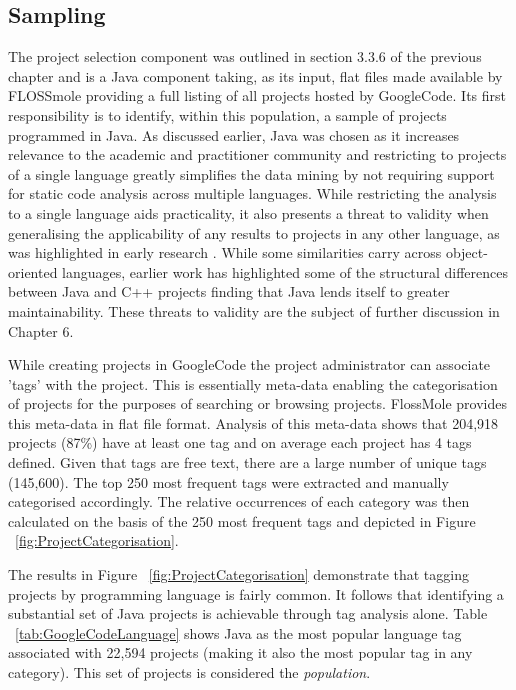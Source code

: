\subsection{Sampling}
The project selection component was outlined in section 3.3.6 of the previous chapter and is a Java component taking, as its input, flat files made available by FLOSSmole providing a full listing of all projects hosted by GoogleCode. Its first responsibility is to identify, within this population, a sample of projects programmed in Java. As discussed earlier, Java was chosen as it increases relevance to the academic and practitioner community and restricting to projects of a single language greatly simplifies the data mining by not requiring support for static code analysis across multiple languages. While restricting the analysis to a single language aids practicality, it also presents a threat to validity when generalising the applicability of any results to projects in any other language, as was highlighted in early research \citep{basili1996validation}. While some similarities carry across object-oriented languages, earlier work has highlighted some of the structural differences between Java and C++ projects \citep{subramanyam2003empirical} \citep{english2009exploring} finding that Java lends itself to greater maintainability. These threats to validity are the subject of further discussion in Chapter 6.

While creating projects in GoogleCode the project administrator can associate 'tags' with the project. This is essentially meta-data enabling the categorisation of projects for the purposes of searching or browsing projects. FlossMole provides this meta-data in flat file format. Analysis of this meta-data shows that 204,918 projects (87\%) have at least one tag and on average each project has 4 tags defined. Given that tags are free text, there are a large number of unique tags (145,600). The top 250 most frequent tags were extracted and manually categorised accordingly. The relative occurrences of each category was then calculated on the basis of the 250 most frequent tags and depicted in Figure ~\ref{fig:ProjectCategorisation}. 

The results in Figure ~\ref{fig:ProjectCategorisation} demonstrate that tagging projects by programming language is fairly common. It follows that identifying a substantial set of Java projects is achievable through tag analysis alone. Table ~\ref{tab:GoogleCodeLanguage} shows Java as the most popular language tag associated with 22,594 projects (making it also the most popular tag in any category). This set of projects is considered the \textit{population}.


